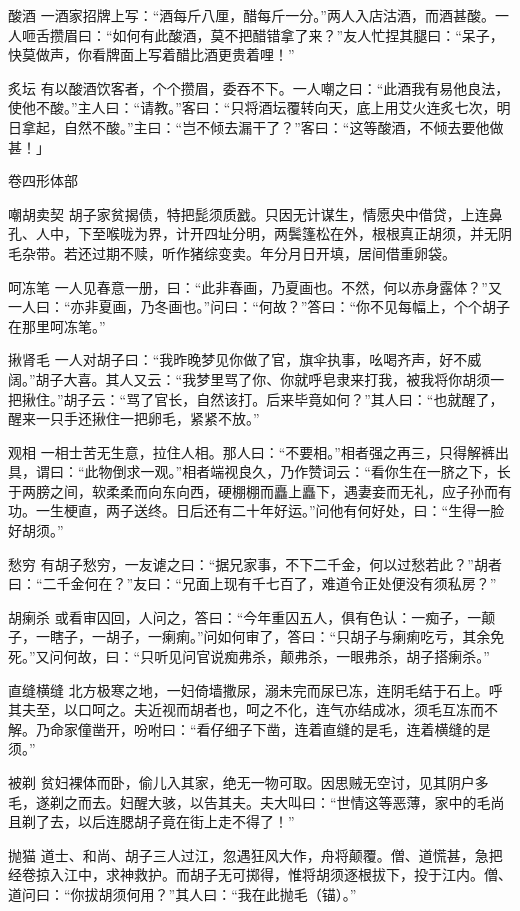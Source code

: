 \documentclass[12pt,UTF8]{ctexbook}
\begin{document}
酸酒
一酒家招牌上写：“酒每斤八厘，醋每斤一分。”两人入店沽酒，而酒甚酸。一人咂舌攒眉曰：“如何有此酸酒，莫不把醋错拿了来？”友人忙捏其腿曰：“呆子，快莫做声，你看牌面上写着醋比酒更贵着哩！”

炙坛
有以酸酒饮客者，个个攒眉，委吞不下。一人嘲之曰：“此酒我有易他良法，使他不酸。”主人曰：“请教。”客曰：“只将酒坛覆转向天，底上用艾火连炙七次，明日拿起，自然不酸。”主曰：“岂不倾去漏干了？”客曰：“这等酸酒，不倾去要他做甚！」

卷四形体部

嘲胡卖契
胡子家贫揭债，特把髭须质戤。只因无计谋生，情愿央中借贷，上连鼻孔、人中，下至喉咙为界，计开四址分明，两鬓篷松在外，根根真正胡须，并无阴毛杂带。若还过期不赎，听作猪综变卖。年分月日开填，居间借重卵袋。

呵冻笔
一人见春意一册，曰：“此非春画，乃夏画也。不然，何以赤身露体？”又一人曰：“亦非夏画，乃冬画也。”问曰：“何故？”答曰：“你不见每幅上，个个胡子在那里呵冻笔。”

揪肾毛
一人对胡子曰：“我昨晚梦见你做了官，旗伞执事，吆喝齐声，好不威阔。”胡子大喜。其人又云：“我梦里骂了你、你就呼皂隶来打我，被我将你胡须一把揪住。”胡子云：“骂了官长，自然该打。后来毕竟如何？”其人曰：“也就醒了，醒来一只手还揪住一把卵毛，紧紧不放。”

观相
一相士苦无生意，拉住人相。那人曰：“不要相。”相者强之再三，只得解裤出具，谓曰：“此物倒求一观。”相者端视良久，乃作赞词云：“看你生在一脐之下，长于两膀之间，软柔柔而向东向西，硬棚棚而矗上矗下，遇妻妾而无礼，应子孙而有功。一生梗直，两子送终。日后还有二十年好运。”问他有何好处，曰：“生得一脸好胡须。”

愁穷
有胡子愁穷，一友谑之曰：“据兄家事，不下二千金，何以过愁若此？”胡者曰：“二千金何在？”友曰：“兄面上现有千七百了，难道令正处便没有须私房？”

胡瘌杀
或看审囚回，人问之，答曰：“今年重囚五人，俱有色认：一痴子，一颠子，一瞎子，一胡子，一瘌痢。”问如何审了，答曰：“只胡子与瘌痢吃亏，其余免死。”又问何故，曰：“只听见问官说痴弗杀，颠弗杀，一眼弗杀，胡子搭瘌杀。”

直缝横缝
北方极寒之地，一妇倚墙撒尿，溺未完而尿已冻，连阴毛结于石上。呼其夫至，以口呵之。夫近视而胡者也，呵之不化，连气亦结成冰，须毛互冻而不解。乃命家僮凿开，吩咐曰：“看仔细子下凿，连着直缝的是毛，连着横缝的是须。”

被剃
贫妇裸体而卧，偷儿入其家，绝无一物可取。因思贼无空讨，见其阴户多毛，遂剃之而去。妇醒大骇，以告其夫。夫大叫曰：“世情这等恶薄，家中的毛尚且剃了去，以后连腮胡子竟在街上走不得了！”

抛猫
道士、和尚、胡子三人过江，忽遇狂风大作，舟将颠覆。僧、道慌甚，急把经卷掠入江中，求神救护。而胡子无可掷得，惟将胡须逐根拔下，投于江内。僧、道问曰：“你拔胡须何用？”其人曰：“我在此抛毛（锚）。”
\end{document}
